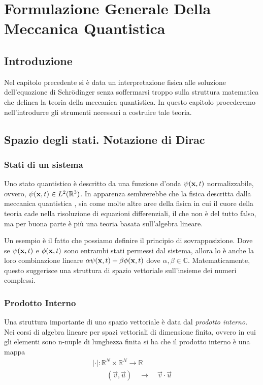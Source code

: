 \setcounter{chapter}{1}
\chapter{Formulazione Generale Della Meccanica Quantistica}
\section{Introduzione}
 Nel capitolo precedente si \`e data un interpretazione fisica alle soluzione dell'equazione di Schr\"odinger senza soffermarsi troppo sulla struttura matematica che delinea la teoria della meccanica quantistica. In questo capitolo procederemo nell'introdurre gli strumenti necessari a costruire tale teoria.
 
 
 \section{Spazio degli stati. Notazione di Dirac}
 
 \subsection{Stati di un sistema}
 Uno stato quantistico \`e descritto da una funzione d'onda $\psi(\bold{x},t)$ normalizzabile, ovvero, $\psi(\bold{x},t) \in L^2(\mathbb{R}^3)$. In apparenza sembrerebbe che la fisica descritta dalla meccanica quantistica , sia come molte altre aree della fisica in cui il cuore della teoria cade nella risoluzione di equazioni differenziali, il che non \`e del tutto falso, ma per buona parte \`e pi\`u una teoria basata sull'algebra lineare. 
 \newline
 
 \noindent Un esempio \`e il fatto che possiamo definire il principio di sovrapposizione. Dove se $\psi(\bold{x},t)$ e $\phi(\bold{x},t)$ sono entrambi stati permessi dal sistema, allora lo \`e anche la loro combinazione lineare $\alpha \psi(\bold{x},t) + \beta \phi(\bold{x},t)$ dove $\alpha,\beta \in \mathbb{C}$. Matematicamente, questo suggerisce una struttura di spazio vettoriale sull'insieme dei numeri complessi.
 
 \subsection{Prodotto Interno}
 
 Una struttura importante di uno spazio vettoriale \`e data dal  \textit{prodotto interno}. Nei corsi di algebra lineare per spazi vettoriali di dimensione finita, ovvero in cui gli elementi sono n-nuple di lunghezza finita si ha che il prodotto interno \`e una mappa
 \begin{equation*}
 \begin{array}{l}
 	|\cdot| : \mathbb{R}^N \times \mathbb{R}^N \to \mathbb{R}\\
 	\quad \quad (\vec{v},\vec{u}) \quad \to \quad \vec{v} \cdot \vec{u}
 \end{array}
 \end{equation*}
 \newline
 
